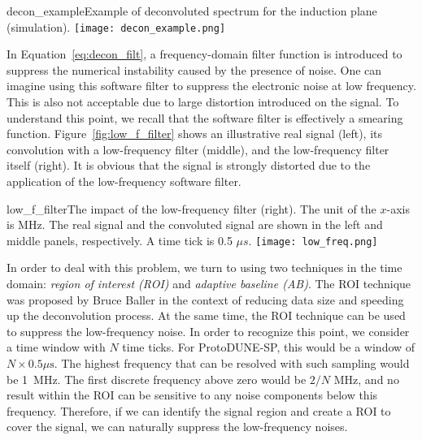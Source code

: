 \begin{cdrfigure}{decon_example}{Example of deconvoluted spectrum for the induction plane (simulation).}
\texttt{[image: decon\_example.png]}
\end{cdrfigure}


In Equation~\eqref{eq:decon_filt}, a frequency-domain  filter function is introduced 
to suppress the numerical instability caused by the presence of noise. One can imagine using %
this
software filter to suppress the electronic noise at low frequency. This is also 
not acceptable due to large distortion introduced on the signal.  To understand this 
point, we recall that the software filter is effectively a smearing function. 
Figure~\ref{fig:low_f_filter} shows an illustrative real signal (left), its convolution 
with a low-frequency filter (middle), and the low-frequency filter itself (right). 
It is obvious that the signal is strongly distorted due to the application of the 
low-frequency software filter. 

\begin{cdrfigure}{low_f_filter}{The impact of the low-frequency filter (right). The unit of the $x$-axis 
is MHz.  The real signal and the convoluted signal are shown in the left and
middle panels, respectively. A time tick is 0.5 $\mu s$.}
\texttt{[image: low\_freq.png]}
\end{cdrfigure}

In order to deal with this problem, we turn to using two techniques in the time domain: 
\textit{region of interest (ROI)} and \textit{adaptive baseline (AB)}. The ROI technique
was proposed by Bruce Baller  in the context of reducing data size and speeding up the 
deconvolution process. At the same time, the ROI technique can %
be used to 
suppress the low-frequency noise. In order to recognize this point, we consider
a time window with $N$ time ticks.  For ProtoDUNE-SP, this would be a window of 
$N\times0.5\mu\mbox{s}$. The highest frequency that can be resolved with such 
sampling would be 1~MHz. The first discrete frequency above zero would be $2/N$ MHz, 
and no result within the ROI can be sensitive to any noise components below this 
frequency.  Therefore, if we can identify the signal region and create a ROI to 
cover the signal, we can naturally suppress the low-frequency noises. 

